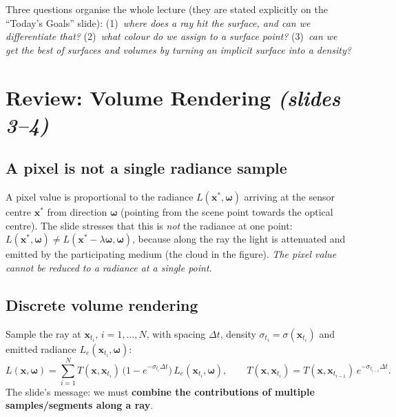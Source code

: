 \documentclass[11pt,a4paper]{article}
\newcommand{\bx}{\bm{x}}
\newcommand{\bom}{{\bm{\omega}}}
\theoremstyle{definition}
\theoremstyle{plain}
\theoremstyle{remark}
\begin{document}

\begin{intuition}
Three questions organise the whole lecture (they are stated explicitly on the ``Today's Goals'' slide):
(1)~\emph{where does a ray hit the surface, and can we differentiate that?}
(2)~\emph{what colour do we assign to a surface point?}
(3)~\emph{can we get the best of surfaces and volumes by turning an implicit surface into a density?}
\end{intuition}

\section{Review: Volume Rendering \emph{(slides 3--4)}}
\subsection*{A pixel is not a single radiance sample}
A pixel value is proportional to the radiance $L(\bx^*,\bom)$ arriving at the sensor centre $\bx^*$ from direction
$\bom$ (pointing from the scene point towards the optical centre). The slide stresses that this is
\emph{not} the radiance at one point: $L(\bx^*,\bom)\neq L(\bx^*-\lambda\bom,\bom)$, because along the ray the
light is attenuated and emitted by the participating medium (the cloud in the figure).
\emph{The pixel value cannot be reduced to a radiance at a single point.}

\subsection*{Discrete volume rendering}
Sample the ray at $\bx_{t_i}$, $i=1,\dots,N$, with spacing $\Delta t$, density $\sigma_{t_i}=\sigma(\bx_{t_i})$ and
emitted radiance $L_e(\bx_{t_i},\bom)$:
\begin{equation}\label{eq:vr}
L(\bx,\bom)=\sum_{i=1}^{N} T(\bx,\bx_{t_i})\,\bigl(1-e^{-\sigma_{t_i}\Delta t}\bigr)\,L_e(\bx_{t_i},\bom),
\qquad
T(\bx,\bx_{t_i})=T(\bx,\bx_{t_{i-1}})\,e^{-\sigma_{t_{i-1}}\Delta t}.
\end{equation}
The slide's message: we must \textbf{combine the contributions of multiple samples/segments along a ray}.
\end{document}
